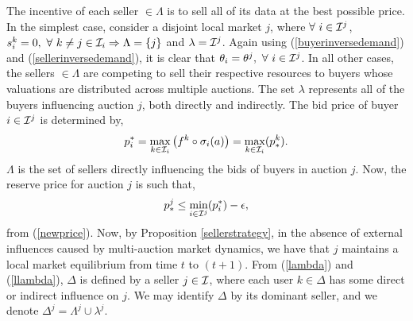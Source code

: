 {\iffalse
Now, we have,
\begin{equation}\label{rho}
    \rho^j(p_*^j) \le \displaystyle\sum_{i\in\mcI^j} e_i(a(s_i^j)),
\end{equation}
from (\ref{datademand}), (\ref{buyerinversedemand}),
(\ref{sellerinversedemand}), and so $p_i^j \ge p_{*}^j \ge p_i^k, \ \forall \ i \in
[p_i^j]_{i\in\mcI^j}$ and $\forall \ k \in [p_i^k]_{k\in\mcI_i}$
\fi

The incentive of each seller $\in\Lambda$ is to sell all of its data at the
best possible price. In the simplest case,
consider a disjoint local market $j$, where $\forall \ i\in\mathcal{I}^j$, $s_i^k = 0,
\ \forall \ k\ne j \in \mathcal{I}_i \Rightarrow \Lambda = \lbrace j \rbrace$ and
$\lambda = \mathcal{I}^j$. 
Again using (\ref{buyerinversedemand}) and  (\ref{sellerinversedemand}), it is
clear that $\theta_i = \theta^j, \ \forall \ i \in \mathcal{I}^j$.
In all other cases, the sellers $\in\Lambda$ are competing to sell
their respective resources to buyers whose valuations are distributed across multiple auctions. 
The set $\lambda$ represents all of the buyers influencing auction $j$, both
directly and indirectly. 
The bid price of buyer $i\in\mathcal{I}^j$ is determined by,
\begin{equation}\label{maxbid}
    p_i^* = \max_{k\in\mathcal{I}_i}\big(f^k \circ \sigma_i(a)\big)= \max_{k\in\mathcal{I}_i}(p_*^k).
\end{equation}
$\Lambda$ is the set of sellers directly influencing the bids of buyers
in auction $j$. Now, the reserve price for auction $j$ is such that,
\begin{equation}\label{resprice}
    p_*^j \le \min_{i\in\mathcal{I}^j}(p_i^*) - \epsilon,
\end{equation}
from (\ref{newprice}). Now, by Proposition \ref{sellerstrategy}, in the absence
of external influences caused by multi-auction market dynamics, we have 
that $j$ maintains a local market equilibrium from time $t$ to $(t+1)$.
From (\ref{lambda}) and (\ref{llambda}), $\Delta$ is defined by a seller $j\in\mathcal{I}$, where each
user $k\in\Delta$ has some direct or indirect influence on $j$. 
We may identify $\Delta$ by its dominant seller, and we denote $\Delta^j = \Lambda^j
\cup \lambda^j$.

}
